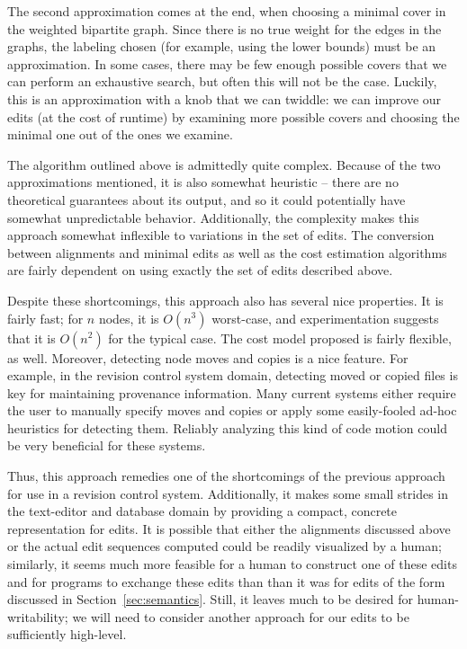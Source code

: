 \documentclass{article}
\newif\ifhighlightnew\highlightnewfalse
\newenvironment{newcontent}{\ifhighlightnew\color{green!55!black}[new]\fi}{\ifhighlightnew\color{black}\fi}
\begin{document}
The second approximation comes at the end, when choosing a minimal cover in
the weighted bipartite graph. Since there is no true weight for the edges in
the graphs, the labeling chosen (for example, using the lower bounds) must
be an approximation. In some cases, there may be few enough possible covers
that we can perform an exhaustive search, but often this will not be the
case. Luckily, this is an approximation with a knob that we can twiddle: we
can improve our edits (at the cost of runtime) by examining more possible
covers and choosing the minimal one out of the ones we examine.

The algorithm outlined above is admittedly quite complex. Because of the two
approximations mentioned, it is also somewhat heuristic -- there are no
theoretical guarantees about its output, and so it could potentially have
somewhat unpredictable behavior. Additionally, the complexity makes this
approach somewhat inflexible to variations in the set of edits. The
conversion between alignments and minimal edits as well as the cost
estimation algorithms are fairly dependent on using exactly the set of edits
described above.

Despite these shortcomings, this approach also has several nice properties.
It is fairly fast; for $n$ nodes, it is $O(n^3)$ worst-case, and
experimentation suggests that it is $O(n^2)$ for the typical case. The cost
model proposed is fairly flexible, as well. Moreover, detecting node moves
and copies is a nice feature.
\begin{newcontent}%
For example, in the revision control system domain, detecting moved or
copied files is key for maintaining provenance information. Many current
systems either require the user to manually specify moves and copies or
apply some easily-fooled ad-hoc heuristics for detecting them. Reliably
analyzing this kind of code motion could be very beneficial for these
systems.

Thus, this approach remedies one of the shortcomings of the previous
approach for use in a revision control system. Additionally, it makes some
small strides in the text-editor and database domain by providing a compact,
concrete representation for edits. It is possible that either the alignments
discussed above or the actual edit sequences computed could be readily
visualized by a human; similarly, it seems much more feasible for a human to
construct one of these edits and for programs to exchange these edits than
than it was for edits of the form discussed in Section~\ref{sec:semantics}.
Still, it leaves much to be desired for human-writability; we will need to
consider another approach for our edits to be sufficiently high-level.
\end{newcontent}
\end{document}
